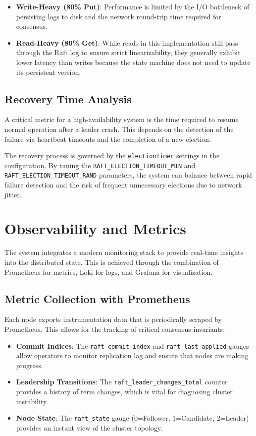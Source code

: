 \begin{itemize}
    \item \textbf{Write-Heavy (80\% Put)}: Performance is limited by the I/O bottleneck of persisting logs to disk and the network round-trip time required for consensus.
    \item \textbf{Read-Heavy (80\% Get)}: While reads in this implementation still pass through the Raft log to ensure strict linearizability, they generally exhibit lower latency than writes because the state machine does not need to update its persistent version.
\end{itemize}



\subsection{Recovery Time Analysis}
A critical metric for a high-availability system is the time required to resume normal operation after a leader crash. This depends on the detection of the failure via heartbeat timeouts and the completion of a new election.

The recovery process is governed by the \texttt{electionTimer} settings in the configuration.
By tuning the \texttt{RAFT\_ELECTION\_TIMEOUT\_MIN} and \texttt{RAFT\_ELECTION\_TIMEOUT\_RAND} parameters, the system can balance between rapid failure detection and the risk of frequent unnecessary elections due to network jitter.

\section{Observability and Metrics}
\label{sec:observability}
The system integrates a modern monitoring stack to provide real-time insights into the distributed state. This is achieved through the combination of Prometheus for metrics, Loki for logs, and Grafana for visualization.

\subsection{Metric Collection with Prometheus}
Each node exports instrumentation data that is periodically scraped by Prometheus. This allows for the tracking of critical consensus invariants:
\begin{itemize}
    \item \textbf{Commit Indices}: The \texttt{raft\_commit\_index} and \texttt{raft\_last\_applied} gauges allow operators to monitor replication lag and ensure that nodes are making progress.
    \item \textbf{Leadership Transitions}: The \texttt{raft\_leader\_changes\_total} counter provides a history of term changes, which is vital for diagnosing cluster instability.
    \item \textbf{Node State}: The \texttt{raft\_state} gauge (0=Follower, 1=Candidate, 2=Leader) provides an instant view of the cluster topology.
\end{itemize}

